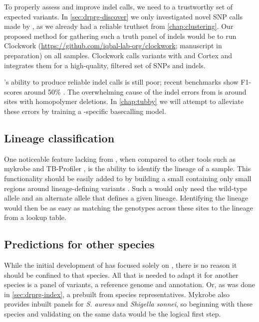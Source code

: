 To properly assess and improve indel calls, we need to a trustworthy set of expected variants. In \autoref{sec:drprg-discover} we only investigated novel SNP calls made by \drprg{}, as we already had a reliable truthset from \autoref{chap:clustering}. Our proposed method for gathering such a truth panel of indels would be to run Clockwork (\url{https://github.com/iqbal-lab-org/clockwork}; manuscript in preparation) on all samples. Clockwork calls variants with  and Cortex and integrates them for a high-quality, filtered set of SNPs and indels.

\ont{}'s ability to produce reliable indel calls is still poor; recent benchmarks show F1-scores around 50\% \cite{clairvoyant2019}. The overwhelming cause of the indel errors from \ont{} is around sites with homopolymer deletions. In \autoref{chap:tubby} we will attempt to alleviate these errors by training a \mtb{}-specific \ont{} basecalling model.

\subsection{Lineage classification}

One noticeable feature lacking from \drprg{}, when compared to other tools such as mykrobe and TB-Profiler \cite{phelan2019}, is the ability to identify the lineage of a sample. This functionality should be easily added to \drprg{} by building a small \prg{} containing only small regions around lineage-defining variants \cite{Shitikov2017,Rutaihwa2019,stucki2016}. Such a \prg{} would only need the wild-type allele and an alternate allele that defines a given lineage. Identifying the lineage would then be as easy as matching the genotypes across these sites to the lineage from a lookup table.

\subsection{Predictions for other species}

While the initial development of \drprg{} has focused solely on \mtb{}, there is no reason it should be confined to that species. All that is needed to adapt it for another species is a panel of variants, a reference genome and annotation. Or, as was done in \autoref{sec:drprg-index}, a prebuilt \prg{} from species representatives. Mykrobe also provides inbuilt panels for \textit{S. aureus} and \textit{Shigella sonnei}, so beginning with these species and validating on the same data would be the logical first step. 


